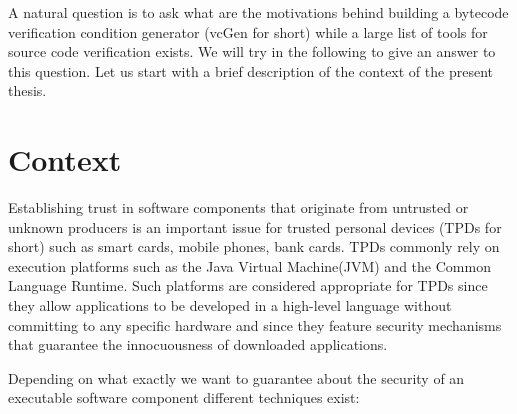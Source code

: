 A natural question is to ask what are the motivations behind building a bytecode verification condition generator (vcGen for short)
 while a large list of tools for source code verification exists. 
We will try in the following to give an answer to this question. Let us start with a brief description of the context of the present thesis.
\section{Context}
  Establishing trust in software components that originate from untrusted or unknown producers is an important issue  for trusted personal devices
  (TPDs for short) such as smart cards, mobile phones, bank cards.
   TPDs  commonly rely on execution platforms such as the Java 
  Virtual Machine(JVM) and the Common Language Runtime. Such platforms are
  considered appropriate for TPDs since they allow applications to
  be developed in a high-level language without committing to any
  specific hardware and since they feature security mechanisms that
  guarantee the innocuousness of downloaded applications.
        



Depending on what exactly we want to guarantee about the security of an executable software component 
 different techniques exist:


